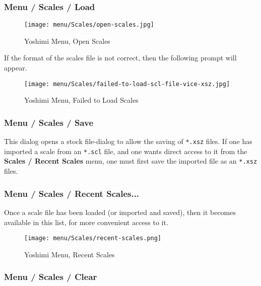 \subsubsection{Menu / Scales / Load}
\label{subsec:menu_scales_load}

\begin{figure}[H]
   \centering 
   \texttt{[image: menu/Scales/open-scales.jpg]}
   \caption{Yoshimi Menu, Open Scales}
   \label{fig:yoshimi_menu_open_scales}
\end{figure}

   If the format of the scales file is not correct, then the following prompt
   will appear.

\begin{figure}[H]
   \centering 
   \texttt{[image: menu/Scales/failed-to-load-scl-file-vice-xsz.jpg]}
   \caption{Yoshimi Menu, Failed to Load Scales}
   \label{fig:yoshimi_menu_failed_to_load_scales}
\end{figure}

\subsubsection{Menu / Scales / Save}
\label{subsec:menu_scales_save}

   This dialog opens a stock file-dialog to allow the saving of
   \texttt{*.xsz} files.
   If one has imported a scale from an \texttt{*.scl} file, and one
   wants direct access to it from the \textbf{Scales / Recent Scales} menu, one
   must first save the imported file as an \texttt{*.xsz} files.

\subsubsection{Menu / Scales / Recent Scales...}
\label{subsec:menu_scales_recent_scales}

   Once a scale file has been loaded (or imported and saved), then it
   becomes available in this list, for more convenient access to it.

\begin{figure}[H]
   \centering 
   \texttt{[image: menu/Scales/recent-scales.png]}
   \caption{Yoshimi Menu, Recent Scales}
   \label{fig:yoshimi_menu_recent_scales}
\end{figure}

\subsubsection{Menu / Scales / Clear}
\label{subsec:menu_scales_clear}

